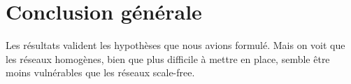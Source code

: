 \documentclass[11pt,a4paper]{article}
\begin{document}
\section{Conclusion générale} %

	Les résultats valident les hypothèses que nous avions formulé. Mais on voit que les réseaux homogènes, bien que plus difficile à mettre en place, semble être moins vulnérables que les réseaux scale-free. 




%
%
%
%
%
%
%
%
%
%
%
%
%
%
\end{document}
